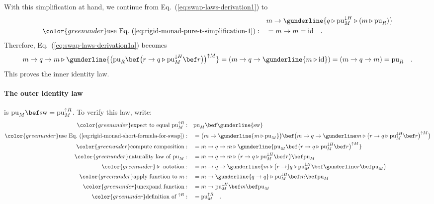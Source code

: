 With this simplification at hand, we continue from Eq.~(\ref{eq:swap-laws-derivation1})
to
\begin{align*}
 & m\rightarrow\gunderline{q\triangleright\text{pu}_{M}^{\downarrow H}\triangleright\left(m\triangleright\text{pu}_{R}\right)}\\
{\color{greenunder}\text{use Eq.~(\ref{eq:rigid-monad-pure-t-simplification-1})}:}\quad & =m\rightarrow m=\text{id}\quad.
\end{align*}
Therefore, Eq.~(\ref{eq:swap-laws-derivation1a}) becomes
\[
m\rightarrow q\rightarrow m\triangleright\gunderline{\big(\text{pu}_{R}\bef\big(r\rightarrow q\triangleright\text{pu}_{M}^{\downarrow H}\bef r\big)\big)^{\uparrow M}}=(m\rightarrow q\rightarrow\gunderline{m\triangleright\text{id}})=(m\rightarrow q\rightarrow m)=\text{pu}_{R}\quad.
\]
This proves the inner identity law.

\paragraph{The outer identity law}

is $\text{pu}_{M}\bef\text{sw}=\text{pu}_{M}^{\uparrow R}$. To verify
this law, write:
\begin{align*}
{\color{greenunder}\text{expect to equal }\text{pu}_{M}^{\uparrow R}:}\quad & \text{pu}_{M}\bef\gunderline{\text{sw}}\\
{\color{greenunder}\text{use Eq.~(\ref{eq:rigid-monad-short-formula-for-swap})}:}\quad & =\big(m\rightarrow\gunderline{m\triangleright\text{pu}_{M}}\big)\bef\big(m\rightarrow q\rightarrow\gunderline m\triangleright\big(r\rightarrow q\triangleright\text{pu}_{M}^{\downarrow H}\bef r\big)^{\uparrow M}\big)\\
{\color{greenunder}\text{compute composition}:}\quad & =m\rightarrow q\rightarrow m\triangleright\gunderline{\text{pu}_{M}\bef\big(r\rightarrow q\triangleright\text{pu}_{M}^{\downarrow H}\bef r\big)^{\uparrow M}}\\
{\color{greenunder}\text{naturality law of }\text{pu}_{M}:}\quad & =m\rightarrow q\rightarrow m\triangleright\big(r\rightarrow q\triangleright\text{pu}_{M}^{\downarrow H}\bef r\big)\bef\text{pu}_{M}\\
{\color{greenunder}\triangleright\text{-notation}:}\quad & =m\rightarrow q\rightarrow\gunderline{m\triangleright\big(r\rightarrow}q\triangleright\text{pu}_{M}^{\downarrow H}\bef\gunderline r\bef\text{pu}_{M}\big)\\
{\color{greenunder}\text{apply function to }m:}\quad & =m\rightarrow\gunderline{q\rightarrow q}\triangleright\text{pu}_{M}^{\downarrow H}\bef m\bef\text{pu}_{M}\\
{\color{greenunder}\text{unexpand function}:}\quad & =m\rightarrow\text{pu}_{M}^{\downarrow H}\bef m\bef\text{pu}_{M}\\
{\color{greenunder}\text{definition of }{}^{\uparrow R}:}\quad & =\text{pu}_{M}^{\uparrow R}\quad.
\end{align*}


